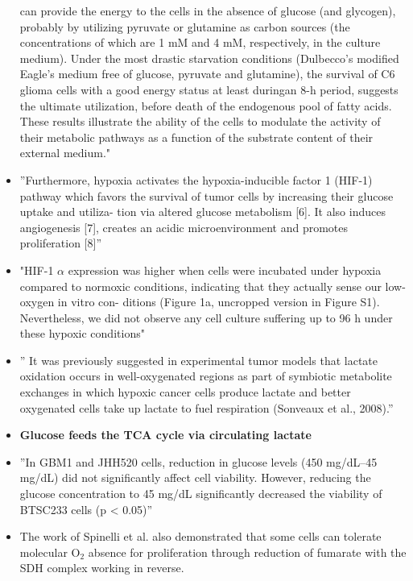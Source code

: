 \documentclass[11pt,a4paper]{article}
\begin{document}
\begin{itemize}
can provide the energy to the cells in the absence of glucose (and glycogen), probably by utilizing pyruvate or glutamine as carbon sources (the concentrations of which are
1 mM and 4 mM, respectively, in the culture medium). Under the most drastic starvation conditions (Dulbecco’s modified Eagle’s medium free of glucose, pyruvate and glutamine), the survival of C6 glioma cells with a good energy status at least duringan
8-h period, suggests the ultimate utilization, before death of the endogenous pool of fatty acids. These results illustrate the ability of the cells to modulate the activity of
their metabolic pathways as a function of the substrate content of their external medium."\cite{Piannet1991}
\item ”Furthermore, hypoxia activates the hypoxia-inducible factor 1 (HIF-1) pathway which favors the survival of tumor cells by increasing their glucose uptake and utiliza-
tion via altered glucose metabolism [6]. It also induces angiogenesis [7], creates an acidic microenvironment and promotes proliferation [8]”\cite{Shen2018}
\item "HIF-1 $\alpha$ expression was higher when cells were incubated under hypoxia compared
to normoxic conditions, indicating that they actually sense our low-oxygen in vitro con-
ditions (Figure 1a, uncropped version in Figure S1). Nevertheless, we did not observe
any cell culture suffering up to 96 h under these hypoxic conditions"\cite{Bailleul2021}
\item ” It was previously suggested in experimental tumor models that lactate oxidation occurs in well-oxygenated regions as part of symbiotic metabolite exchanges in which hypoxic cancer cells produce lactate and better oxygenated cells take up lactate to fuel respiration (Sonveaux et al., 2008).”\cite{Faubert2017}
 \item \textbf{Glucose feeds the TCA cycle via circulating lactate}  \cite{Hui2017}
 \item ”In GBM1 and JHH520 cells, reduction in glucose levels (450 mg/dL–45 mg/dL) did not significantly affect cell viability. However, reducing the glucose concentration to
45 mg/dL significantly decreased the viability of BTSC233 cells (p < 0.05)” \cite{Yusuf2022}
\item The work of Spinelli et al. also demonstrated that some cells can tolerate molecular O$_{2}$ absence for proliferation through reduction of fumarate with the SDH complex working in reverse. \cite{Spinelli2021}
\end{itemize}

\newpage


\end{document}
